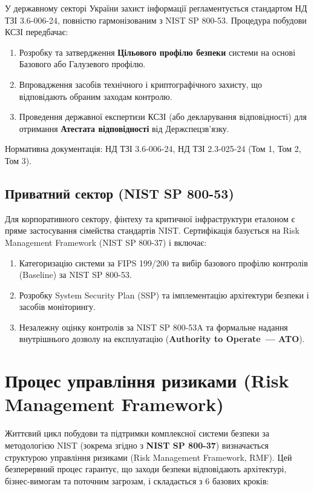 У державному секторі України захист інформації регламентується стандартом НД ТЗІ 3.6-006-24,
повністю гармонізованим з NIST SP 800-53. Процедура побудови КСЗІ передбачає:

\begin{enumerate}
    \item Розробку та затвердження \textbf{Цільового профілю безпеки} системи на основі Базового
          або Галузевого профілю.
    \item Впровадження засобів технічного і криптографічного захисту, що відповідають обраним
          заходам контролю.
    \item Проведення державної експертизи КСЗІ (або декларування відповідності) для отримання
          \textbf{Атестата відповідності} від Держспецзв'язку.
\end{enumerate}

Нормативна документація: НД ТЗІ 3.6-006-24, НД ТЗІ 2.3-025-24 (Том 1, Том 2, Том 3).

\subsection{Приватний сектор (NIST SP 800-53)}

Для корпоративного сектору, фінтеху та критичної інфраструктури еталоном є пряме застосування
сімейства стандартів NIST. Сертифікація базується на Risk Management Framework (NIST SP 800-37)
і включає:

\begin{enumerate}
    \item Категоризацію системи за FIPS 199/200 та вибір базового профілю контролів (Baseline)
          за NIST SP 800-53.
    \item Розробку System Security Plan (SSP) та імплементацію архітектури безпеки і засобів
          моніторингу.
    \item Незалежну оцінку контролів за NIST SP 800-53A та формальне надання внутрішнього дозволу
          на експлуатацію (\textbf{Authority to Operate~--- ATO}).
\end{enumerate}

\section{Процес управління ризиками (Risk Management Framework)}

Життєвий цикл побудови та підтримки комплексної системи безпеки за методологією NIST (зокрема згідно з \textbf{NIST SP 800-37})
визначається структурою управління ризиками (Risk Management Framework, RMF). Цей безперервний процес гарантує,
що заходи безпеки відповідають архітектурі, бізнес-вимогам та поточним загрозам, і складається з 6 базових кроків:

